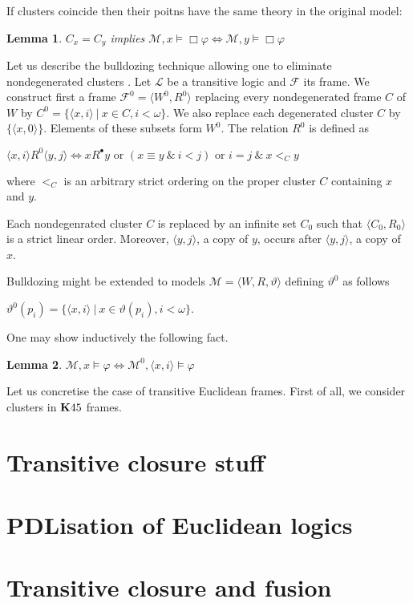 \documentclass[a4paper]{article}
\theoremstyle{defin}
\theoremstyle{theorem}
\theoremstyle{prop}
\theoremstyle{lemma}
\newtheorem{lemma}{Lemma}
\theoremstyle{ex}
\theoremstyle{col}
\begin{document}
If clusters coincide then their poitns have the same theory in the original model:

\begin{lemma}
  $C_x = C_y$ implies $\mathcal{M}, x \models \Box \varphi \Leftrightarrow \mathcal{M}, y \models \Box \varphi$
\end{lemma}

Let us describe the bulldozing technique allowing one to eliminate nondegenerated clusters \cite{bull1984basic}. Let $\mathcal{L}$ be a transitive logic and $\mathcal{F}$ its frame. We construct first a frame $\mathcal{F}^0 = \langle W^{0}, R^{0} \rangle$ replacing every nondegenerated frame $C$ of $W$ by $C^0 = \{ \langle x, i \rangle \: | \: x \in C, i < \omega \}$. We also replace each degenerated cluster $C$ by $\{ \langle x,0 \rangle\}$.
Elements of these subsets form $W^0$. The relation $R^{0}$ is defined as
\begin{center}
  $\langle x, i \rangle R^{0} \langle y, j \rangle \Leftrightarrow x R^{\bullet} y \text{ or } (x \equiv y \: \& \: i < j) \text{ or } i = j \: \& \: x <_C y$
\end{center}
where $<_C$ is an arbitrary strict ordering on the proper cluster $C$ containing $x$ and $y$.

Each nondegenrated cluster $C$ is replaced by an infinite set $C_0$ such that $\langle C_0, R_0 \rangle$ is a strict linear order. Moreover, $\langle y, j \rangle$, a copy of $y$, occurs after $\langle y, j \rangle$, a copy of $x$.

Bulldozing might be extended to models $\mathcal{M} = \langle W, R, \vartheta \rangle$ defining $\vartheta^0$ as follows
\begin{center}
  $\vartheta^{0}(p_i) = \{ \langle x, i \rangle \: | \: x \in \vartheta(p_i), i < \omega \}$.
\end{center}

One may show inductively the following fact.
\begin{lemma}
  $\mathcal{M}, x \models \varphi \Leftrightarrow \mathcal{M}^{0}, \langle x, i \rangle \models \varphi$
\end{lemma}

Let us concretise the case of transitive Euclidean frames. First of all, we consider clusters in ${\bf K}45$ frames.

\subsection{}

\section{Transitive closure stuff}

\section{PDLisation of Euclidean logics}

\section{Transitive closure and fusion}



\end{document}
